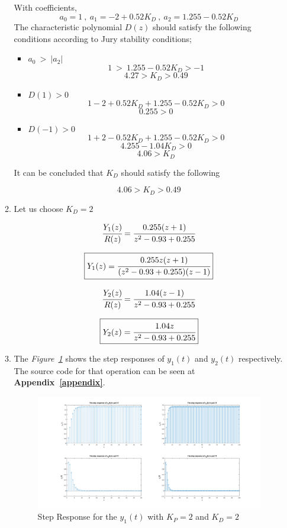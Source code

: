\documentclass[a4paper,12pt]{article}
\begin{document}
\begin{enumerate}
\begin{enumerate}
			With coefficients, 
		$$ \boxed{a_0=1} \ , \ \boxed{a_1=-2+0.52K_D} \ ,\ \boxed{a_2=1.255-0.52K_D} $$		
		The characteristic polynomial $D(z)$ should satisfy the following conditions according to Jury stability conditions;
		\begin{itemize}
			\item $a_0\ >\ |a_2| $ \\
			$$ 1\ >\ 1.255-0.52K_D > -1 $$
			$$\boxed{ 4.27 > K_D > 0.49 }$$
			\item $D(1)>0$ \\
			$$ 1-2+0.52K_D+1.255-0.52K_D > 0$$
			$$ \boxed{ 0.255>0} $$
			\item $D(-1)>0$ \\
			$$ 1+2-0.52K_D+1.255-0.52K_D > 0$$
			$$ 4.255-1.04K_D>0 $$
			$$\boxed{ 4.06>K_D }$$				
		\end{itemize}
		It can be concluded that  $K_D$ should satisfy the following
		
		$$\boxed{ 4.06 > K_D > 0.49 }$$
		
		
		
		\item Let us choose \textbf{$K_D=2$} 
		
			$$\cfrac{Y_1(z)}{R(z)} =\cfrac{0.255(z+1)}{z^2-0.93+0.255}$$
			
			$$\boxed{ Y_1(z)= \cfrac{0.255z(z+1)}{(z^2-0.93+0.255)(z-1)} }$$	
			
				
			$$ \cfrac{Y_2(z)}{R(z)} =\cfrac{1.04(z-1)}{z^2-0.93+0.255}$$
			
			$$\boxed{ Y_2(z)= \cfrac{1.04z}{z^2-0.93+0.255} }$$	
		
		
		\item The \textit{Figure\ \ref{fig:stepy1b}} shows the step responses of $y_1(t)$ and $y_2(t)$ respectively. The source code for that operation can be seen at \textbf{Appendix~\ref{appendix}}.
		 
		
		 
		  \begin{figure}[H]
		 	\center
		 	\setlength{\unitlength}{\textwidth} 
		 	\includegraphics[width=1.0\unitlength]{images/1f}
		 	\caption{\label{fig:stepy1b} Step Response for the $y_1(t)$ with $K_P=2$ and $K_D=2$}
		 \end{figure}
	 	

\end{enumerate}
\end{enumerate}
\end{document}
